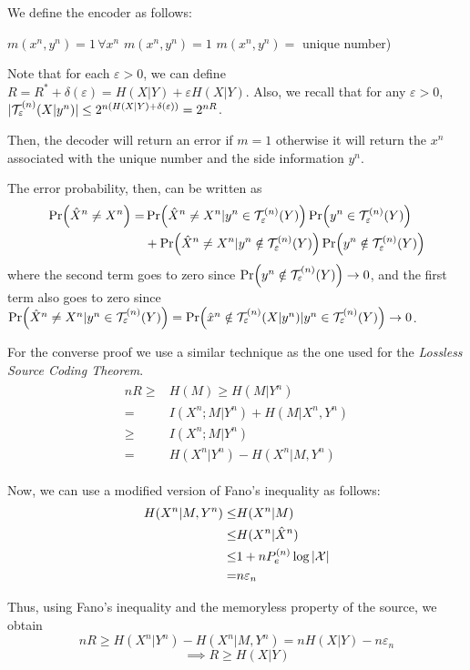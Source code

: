 
We define the encoder as follows:
%
\begin{algorithm}
	{$ m(x^n,y^n) = 1 \, \forall x^n$}
	{
		{$ m(x^n,y^n) = 1$}
		{$m(x^n,y^n) = $ unique number)}
	}
\end{algorithm}

Note that for each $\varepsilon>0$, we can define $R = R^* + \delta(\varepsilon) = H(X|Y) + \varepsilon H(X|Y)$. Also, we recall that for any $\varepsilon>0$, $|\mathcal{T}_\varepsilon^{(n)}(X|y^n)| \leq 2^{n(H(X|Y) + \delta(\varepsilon))} = 2^{nR}$.

Then, the decoder will return an error if $m=1$ otherwise it will return the $x^n$ associated with the unique number and the side information $y^n$.

The error probability, then, can be written as
%
\begin{align}
\begin{split}
\Pr(\hat{X}^n \neq X^n) =& \Pr(\hat{X}^n \neq X^n|y^n\in \mathcal{T}_\varepsilon^{(n)}(Y))\Pr(y^n\in \mathcal{T}_\varepsilon^{(n)}(Y))\\
&+ \Pr(\hat{X}^n \neq X^n|y^n\notin \mathcal{T}_\varepsilon^{(n)}(Y))\Pr(y^n\notin \mathcal{T}_\varepsilon^{(n)}(Y))
\end{split}
\end{align}
%
where the second term goes to zero since $\Pr(y^n\notin \mathcal{T}_\varepsilon^{(n)}(Y)) \rightarrow 0$, and the first term also goes to zero since $\Pr(\hat{X}^n \neq X^n|y^n\in \mathcal{T}_\varepsilon^{(n)}(Y)) = \Pr(\hat{x}^n \notin \mathcal{T}_\varepsilon^{(n)}(X|y^n) |y^n\in \mathcal{T}_\varepsilon^{(n)}(Y)) \rightarrow 0$.

For the converse proof we use a similar technique as the one used for the \textit{Lossless Source Coding Theorem}.
%
\begin{align}
\begin{split}
nR \geq& H(M) \geq H(M|Y^n)\\
=& I(X^n;M|Y^n) + H(M|X^n,Y^n)\\
\geq& I(X^n;M|Y^n)\\
=& H(X^n|Y^n) - H(X^n|M,Y^n)
\end{split}
\end{align}

Now, we can use a modified version of Fano's inequality as follows:
%
\begin{align}
\begin{split}
H(X^n|M,Y^n) \leq& H(X^n|M)\\
\leq& H(X^n|\hat{X}^n)\\
\leq& 1 + n P_e^{(n)}  \log |\mathcal{X}|\\
=& n \varepsilon_n
\end{split}
\end{align}

Thus, using Fano's inequality and the memoryless property of the source, we obtain
%
\begin{equation}
nR \geq H(X^n|Y^n) - H(X^n|M,Y^n) = nH(X|Y) - n\varepsilon_n
\end{equation}
\begin{equation}
\implies R \geq H(X|Y)
\end{equation}